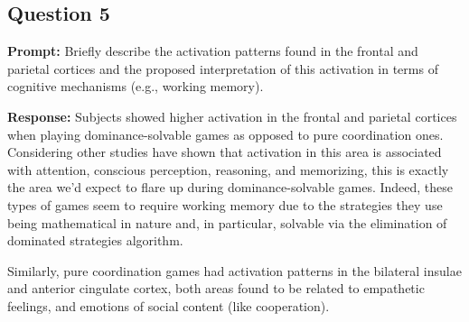 \documentclass{article}
\begin{document}
\subsection*{Question 5}
\noindent\textbf{Prompt:} Briefly describe the activation patterns found in the frontal and parietal cortices and the proposed interpretation of this activation in terms of cognitive mechanisms (e.g., working memory).
\bigskip

\noindent\textbf{Response:} Subjects showed higher activation in the frontal and parietal cortices when playing dominance-solvable games as opposed to pure coordination ones. Considering other studies have shown that activation in this area is associated with attention, conscious perception, reasoning, and memorizing, this is exactly the area we'd expect to flare up during dominance-solvable games. Indeed, these types of games seem to require working memory due to the strategies they use being mathematical in nature and, in particular, solvable via the elimination of dominated strategies algorithm.

Similarly, pure coordination games had activation patterns in the bilateral insulae and anterior cingulate cortex, both areas found to be related to empathetic feelings, and emotions of social content (like cooperation).
\end{document}
